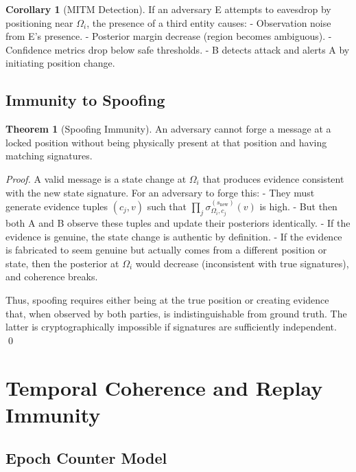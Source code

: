 \documentclass[11pt,a4paper]{article}
\theoremstyle{definition}
\newtheorem{theorem}[definition]{Theorem}
\newtheorem{corollary}[definition]{Corollary}
\begin{document}
\begin{corollary}[MITM Detection]
If an adversary E attempts to eavesdrop by positioning near $\Omega_i$, the presence of a third entity causes:
- Observation noise from E's presence.
- Posterior margin decrease (region becomes ambiguous).
- Confidence metrics drop below safe thresholds.
- B detects attack and alerts A by initiating position change.
\end{corollary}

\subsection{Immunity to Spoofing}

\begin{theorem}[Spoofing Immunity]
An adversary cannot forge a message at a locked position without being physically present at that position and having matching signatures.
\end{theorem}

\begin{proof}
A valid message is a state change at $\Omega_i$ that produces evidence consistent with the new state signature. For an adversary to forge this:
- They must generate evidence tuples $(c_j, v)$ such that $\prod_j \sigma_{\Omega_i, c_j}^{(s_{\text{new}})}(v)$ is high.
- But then both A and B observe these tuples and update their posteriors identically.
- If the evidence is genuine, the state change is authentic by definition.
- If the evidence is fabricated to seem genuine but actually comes from a different position or state, then the posterior at $\Omega_i$ would decrease (inconsistent with true signatures), and coherence breaks.

Thus, spoofing requires either being at the true position or creating evidence that, when observed by both parties, is indistinguishable from ground truth. The latter is cryptographically impossible if signatures are sufficiently independent. \qed
\end{proof}

\section{Temporal Coherence and Replay Immunity}
\label{sec:temporal}

\subsection{Epoch Counter Model}
\end{document}
